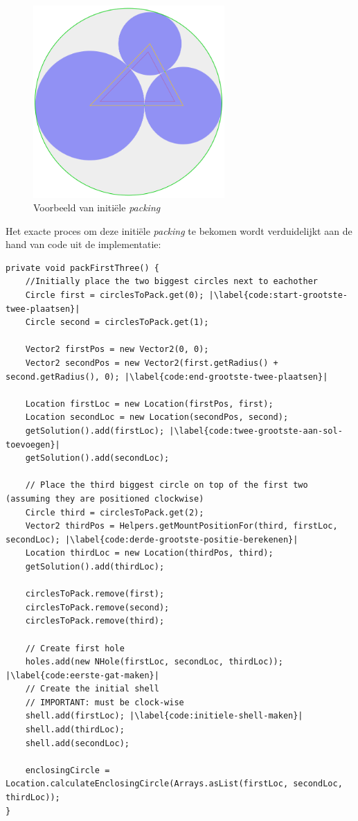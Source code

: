 \documentclass[12pt,a4paper,oneside]{book}
\begin{document}
\begin{figure}
  \centering
  \includegraphics[width=0.65\textwidth]{initialisatie.png}
  \caption{Voorbeeld van initiële \textit{packing}} \label{fig:initialisatie} 
\end{figure}

Het exacte proces om deze initiële \textit{packing} te bekomen wordt verduidelijkt aan de hand van code uit de implementatie:

\begin{lstlisting}
private void packFirstThree() {
	//Initially place the two biggest circles next to eachother
	Circle first = circlesToPack.get(0); |\label{code:start-grootste-twee-plaatsen}|
	Circle second = circlesToPack.get(1);

	Vector2 firstPos = new Vector2(0, 0);
	Vector2 secondPos = new Vector2(first.getRadius() + second.getRadius(), 0); |\label{code:end-grootste-twee-plaatsen}|

	Location firstLoc = new Location(firstPos, first);
	Location secondLoc = new Location(secondPos, second);
	getSolution().add(firstLoc); |\label{code:twee-grootste-aan-sol-toevoegen}|
	getSolution().add(secondLoc);

	// Place the third biggest circle on top of the first two (assuming they are positioned clockwise)
	Circle third = circlesToPack.get(2);
	Vector2 thirdPos = Helpers.getMountPositionFor(third, firstLoc, secondLoc); |\label{code:derde-grootste-positie-berekenen}|
	Location thirdLoc = new Location(thirdPos, third);
	getSolution().add(thirdLoc);

	circlesToPack.remove(first);
	circlesToPack.remove(second);
	circlesToPack.remove(third);

	// Create first hole
	holes.add(new NHole(firstLoc, secondLoc, thirdLoc)); |\label{code:eerste-gat-maken}|
	// Create the initial shell
	// IMPORTANT: must be clock-wise
	shell.add(firstLoc); |\label{code:initiele-shell-maken}|
	shell.add(thirdLoc);
	shell.add(secondLoc);

	enclosingCircle = Location.calculateEnclosingCircle(Arrays.asList(firstLoc, secondLoc, thirdLoc));
}
\end{lstlisting}
\end{document}
